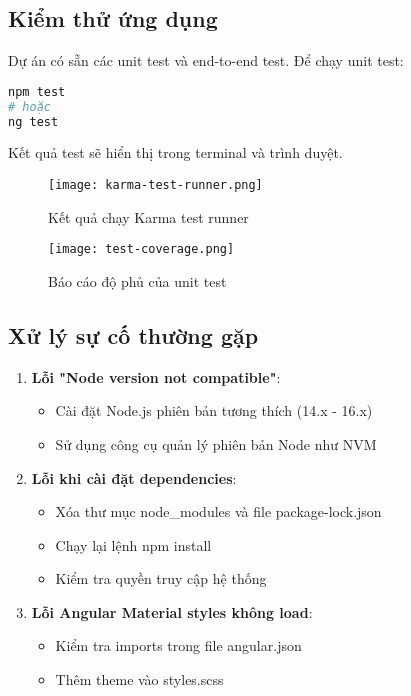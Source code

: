 \documentclass[12pt,a4paper]{article}
\begin{document}
\subsection{Kiểm thử ứng dụng}

Dự án có sẵn các unit test và end-to-end test. Để chạy unit test:

\begin{lstlisting}[language=bash]
npm test
# hoặc
ng test
\end{lstlisting}

Kết quả test sẽ hiển thị trong terminal và trình duyệt.

\begin{figure}[h]
\centering
\texttt{[image: karma-test-runner.png]}
\caption{Kết quả chạy Karma test runner}
\end{figure}

\begin{figure}[h]
\centering
\texttt{[image: test-coverage.png]}
\caption{Báo cáo độ phủ của unit test}
\end{figure}

\subsection{Xử lý sự cố thường gặp}

\begin{tcolorbox}[colback=red!5,colframe=red!40!black,title=Các lỗi thường gặp và cách khắc phục]
\begin{enumerate}
  \item \textbf{Lỗi "Node version not compatible"}:
  \begin{itemize}
    \item Cài đặt Node.js phiên bản tương thích (14.x - 16.x)
    \item Sử dụng công cụ quản lý phiên bản Node như NVM
  \end{itemize}
  
  \item \textbf{Lỗi khi cài đặt dependencies}:
  \begin{itemize}
    \item Xóa thư mục node\_modules và file package-lock.json
    \item Chạy lại lệnh npm install
    \item Kiểm tra quyền truy cập hệ thống
  \end{itemize}
  
  \item \textbf{Lỗi Angular Material styles không load}:
  \begin{itemize}
    \item Kiểm tra imports trong file angular.json
    \item Thêm theme vào styles.scss
  \end{itemize}
\end{enumerate}
\end{tcolorbox}
\end{document}
